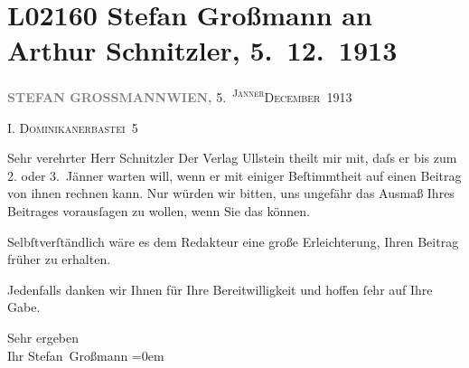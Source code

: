 

\section[Stefan Großmann an Arthur Schnitzler, 5. 12. 1913]{L02160 Stefan Großmann an Arthur Schnitzler, 5. 12. 1913}
\nopagebreak{}
\rehead{ }\normalsize\beginnumbering{}
\toendnotes[C]{\smallbreak\pagebreak[2]}
\toendnotes[C]{\smallbreak}
\pstart
           {\pb}\textcolor{gray}{\textbf{STEFAN GROSSMANN}}\hfill \textcolor{gray}{\textbf{WIEN,}}{ }5. \substVorne{}\textsuperscript{\textsc{Janner}}\substDazwischen{}\textsc{December}\substHinten{} 1913\pend
           
\pstart
           \raggedleft{}I. \textsc{Dominikanerbastei} 5\pend
           
\pstart\center{}Sehr verehrter Herr Schnitzler\pend\vspace{0.5em}
\pstart
           Der Verlag Ullstein theilt mir mit, daſs er bis
               zum 2. oder 3. Jänner warten will, wenn er mit einiger
               Beſtimmtheit auf einen Beitrag von ihnen rechnen kann. Nur würden wir bitten, uns
               ungefähr das Ausmaß Ihres Beitrages vorausſagen zu wollen, wenn Sie das können.\pend
           
\pstart
           Selbſtverſtändlich wäre es dem Redakteur eine große Erleichterung, Ihren Beitrag
               früher zu erhalten.\pend
           
\pstart
           Jedenfalls danken wir Ihnen für Ihre Bereitwilligkeit und hoffen{ }ſehr auf Ihre
               Gabe.\pend
           
\pstart
           Sehr ergeben{\\[\baselineskip]} Ihr \spacefill\mbox{Stefan Großmann}\pend
           \leftskip=0em{}\endnumbering{}  \newcommand{\dateiname}{L02160}\newcommand{\titel}{Stefan Großmann an Arthur Schnitzler, 5. 12. 1913}\newcommand{\editorInnen}{Martin Anton Müller und Gerd-Hermann Susen}
